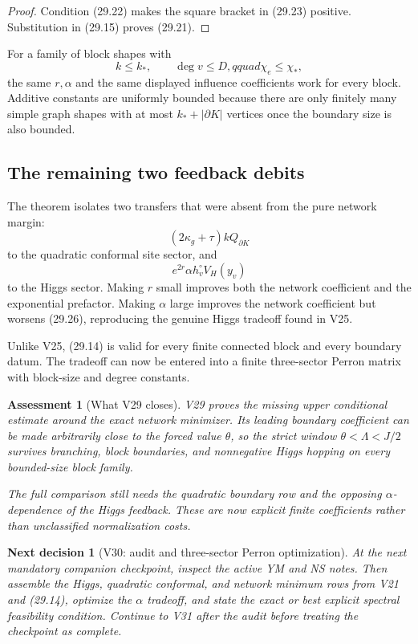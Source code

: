 \documentclass[11pt]{article}
\newtheorem{decision}[theorem]{Next decision}
\newtheorem{assessment}[theorem]{Assessment}
\theoremstyle{remark}
\begin{document}
\begin{proof}
Condition (29.22) makes the square bracket in (29.23) positive.
Substitution in (29.15) proves (29.21).
\end{proof}

For a family of block shapes with
\[
 k\leq k_*,\qquad \deg v\leq D,qquad
 \chi_e\leq\chi_*,                                \tag{29.24}
\]
the same \(r,\alpha\) and the same displayed influence coefficients
work for every block.  Additive constants are uniformly bounded because
there are only finitely many simple graph shapes with at most
\(k_*+|\partial K|\) vertices once the boundary size is also bounded.

\subsection{The remaining two feedback debits}

The theorem isolates two transfers that were absent from the pure
network margin:
\[
 (2\kappa_g+\tau)kQ_{\partial K}                  \tag{29.25}
\]
to the quadratic conformal site sector, and
\[
 e^{2r}\alpha h_v^\circ V_H(y_v)                 \tag{29.26}
\]
to the Higgs sector.  Making \(r\) small improves both the network
coefficient and the exponential prefactor.  Making \(\alpha\) large
improves the network coefficient but worsens (29.26), reproducing the
genuine Higgs tradeoff found in V25.

Unlike V25, (29.14) is valid for every finite connected block and every
boundary datum.  The tradeoff can now be entered into a finite
three-sector Perron matrix with block-size and degree constants.

\begin{assessment}[What V29 closes]
\label{ass:v17v29-status}
V29 proves the missing upper conditional estimate around the exact
network minimizer.  Its leading boundary coefficient can be made
arbitrarily close to the forced value \(\theta\), so the strict window
\(\theta<\Lambda<J/2\) survives branching, block boundaries, and
nonnegative Higgs hopping on every bounded-size block family.

The full comparison still needs the quadratic boundary row and the
opposing \(\alpha\)-dependence of the Higgs feedback.  These are now
explicit finite coefficients rather than unclassified normalization
costs.
\end{assessment}

\begin{decision}[V30: audit and three-sector Perron optimization]
\label{dec:v17v29-next}
At the next mandatory companion checkpoint, inspect the active YM and
NS notes.  Then assemble the Higgs, quadratic conformal, and network
minimum rows from V21 and (29.14), optimize the \(\alpha\) tradeoff, and
state the exact or best explicit spectral feasibility condition.
Continue to V31 after the audit before treating the checkpoint as
complete.
\end{decision}
\end{document}
